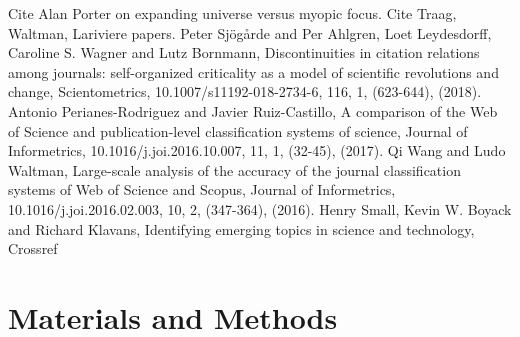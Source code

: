 Cite Alan Porter on expanding universe versus myopic focus. Cite Traag, Waltman, Lariviere papers. Peter Sjögårde and Per Ahlgren, Loet Leydesdorff, Caroline S. Wagner and Lutz Bornmann, Discontinuities in citation relations among journals: self-organized criticality as a model of scientific revolutions and change, Scientometrics, 10.1007/s11192-018-2734-6, 116, 1, (623-644), (2018). Antonio Perianes-Rodriguez and Javier Ruiz-Castillo, A comparison of the Web of Science and publication-level classification systems of science, Journal of Informetrics, 10.1016/j.joi.2016.10.007, 11, 1, (32-45), (2017). Qi Wang and Ludo Waltman, Large-scale analysis of the accuracy of the journal classification systems of Web of Science and Scopus, Journal of Informetrics, 10.1016/j.joi.2016.02.003, 10, 2, (347-364), (2016). Henry Small, Kevin W. Boyack and Richard Klavans, Identifying emerging topics in science and technology, 
Crossref

\section{Materials and Methods}


